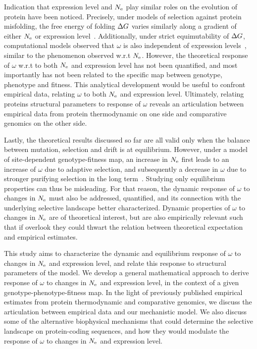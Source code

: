 Indication that expression level and $N_{\mathrm{e}}$ play similar roles on the evolution of protein have been noticed.
Precisely, under models of selection against protein misfolding, the free energy of folding $\Delta G$ varies similarly along a gradient of either $N_{\mathrm{e}}$ or expression level~\citep{Serohijos2013}.
Additionally, under strict equimutability of $\Delta G$, computational models observed that $\omega$ is also independent of expression levels~\citep{Serohijos2012}, similar to the phenomenon observed w.r.t $N_{\mathrm{e}}$.
However, the theoretical response of $\omega$ w.r.t to both $N_{\mathrm{e}}$ and expression level has not been quantified, and most importantly has not been related to the specific map between genotype, phenotype and fitness.
This analytical development would be useful to confront empirical data, relating $\omega$ to both $N_{\mathrm{e}}$ and expression level.
Ultimately, relating proteins structural parameters to response of $\omega$ reveals an articulation between empirical data from protein thermodynamic on one side and comparative genomics on the other side.

Lastly, the theoretical results discussed so far are all valid only when the balance between mutation, selection and drift is at equilibrium.
However, under a model of site-dependent genotype-fitness map, an increase in $N_{\mathrm{e}}$ first leads to an increase of $\omega$ due to adaptive selection, and subsequently a decrease in $\omega$ due to stronger purifying selection in the long term~\citep{Jones2016}.
Studying only equilibrium properties can thus be misleading.
For that reason, the dynamic response of $\omega$ to changes in $N_{\mathrm{e}}$ must also be addressed, quantified, and its connection with the underlying selective landscape better characterized.
Dynamic properties of $\omega$ to changes in $N_{\mathrm{e}}$ are of theoretical interest, but are also empirically relevant such that if overlook they could thwart the relation between theoretical expectation and empirical estimates.

This study aims to characterize the dynamic and equilibrium response of $\omega$ to changes in $N_{\mathrm{e}}$ and expression level, and relate this response to structural parameters of the model.
We develop a general mathematical approach to derive response of $\omega$ to changes in $N_{\mathrm{e}}$ and expression level, in the context of a given genotype-phenotype-fitness map.
In the light of previously published empirical estimates from protein thermodynamic and comparative genomics, we discuss the articulation between empirical data and our mechanistic model.
We also discuss some of the alternative biophysical mechanisms that could determine the selective landscape on protein-coding sequences, and how they would modulate the response of $\omega$ to changes in $N_{\mathrm{e}}$ and expression level.


